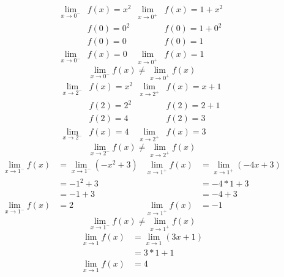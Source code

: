 \documentclass{jhwhw}
\begin{document}
\begin{align*}
    \lim _{x \rightarrow 0^-} & f(x) = x^2 & \lim_{x\to0^+} & f(x) = 1+x^2   \\
                              & f(0) = 0^2 &                & f(0) = 1 + 0^2 \\
                              & f(0) = 0   &                & f(0) = 1       \\
    \lim _{x \rightarrow 0^-} & f(x) = 0   & \lim_{x\to0^+} & f(x) = 1
\end{align*}
\[
    \lim _{x \rightarrow 0^-} f(x) \neq \lim _{x \rightarrow 0^+} f(x)
\]
\begin{align*}
    \lim_{x \to 2^-} & f(x) = x^2 & \lim_{x\to2^+} & f(x) = x + 1 \\
                     & f(2) = 2^2 &                & f(2) = 2 + 1 \\
                     & f(2) = 4   &                & f(2) = 3     \\
    \lim_{x \to 2^-} & f(x) = 4   & \lim_{x\to2^+} & f(x) = 3
\end{align*}
\[
    \lim_{x \to 2^-} f(x) \neq \lim_{x\to2^+} f(x)
\]
\begin{align*}
    \lim_{x \to 1^-} f(x) & = \lim_{x \to 1^-} (-x^2+3) & \lim_{x \to 1^+} f(x) & = \lim_{x \to 1^+} (-4x+3) \\
                          & = -1^2+3                    &                       & = -4*1+3                   \\
                          & = -1 + 3                    &                       & = -4+3                     \\
    \lim_{x \to 1^-} f(x) & = 2                         & \lim_{x \to 1^+} f(x) & = -1
\end{align*}
\[
    \lim_{x \to 1^-} f(x) \neq \lim_{x \to 1^+} f(x)
\]
\begin{align*}
    \lim_{x \to 1} f(x) & = \lim_{x \to 1} (3x+1) \\
                        & = 3*1 + 1               \\
    \lim_{x \to 1} f(x) & = 4
\end{align*}
\end{document}
